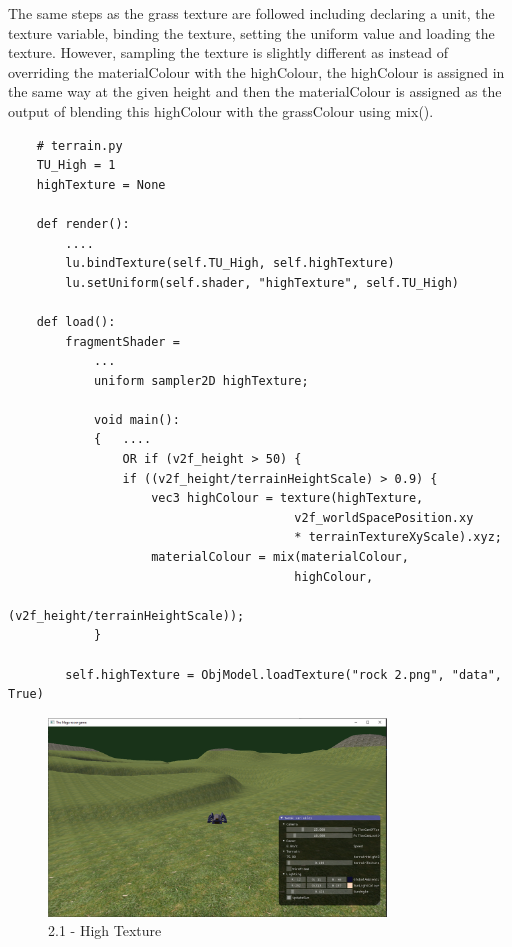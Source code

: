 \documentclass[a4 paper, 12pt]{article}
\begin{document}
The same steps as the grass texture are followed including declaring a unit, the texture variable, binding the texture, setting the uniform value and loading the texture. However, sampling the texture is slightly different as instead of overriding the materialColour with the highColour, the highColour is assigned in the same way at the given height and then the materialColour is assigned as the output of blending this highColour with the grassColour using mix().
\begin{lstlisting}
    # terrain.py
    TU_High = 1
    highTexture = None
    
    def render():
        ....
        lu.bindTexture(self.TU_High, self.highTexture)
        lu.setUniform(self.shader, "highTexture", self.TU_High)
    
    def load():
        fragmentShader = 
            ...
            uniform sampler2D highTexture;
    
            void main():
            {   ....
                OR if (v2f_height > 50) {
                if ((v2f_height/terrainHeightScale) > 0.9) {
                    vec3 highColour = texture(highTexture, 
                                        v2f_worldSpacePosition.xy 
                                        * terrainTextureXyScale).xyz;
                    materialColour = mix(materialColour, 
                                        highColour, 
                                        (v2f_height/terrainHeightScale));
            } 
        
        self.highTexture = ObjModel.loadTexture("rock 2.png", "data", True)        
        \end{lstlisting}

    \begin{figure} [H]
        \centering
        \includegraphics[width=0.8\textwidth, frame]
            {./images/mega_racer/2.1_a.PNG}
        \caption{2.1 - High Texture}   
    \end{figure}
\end{document}
